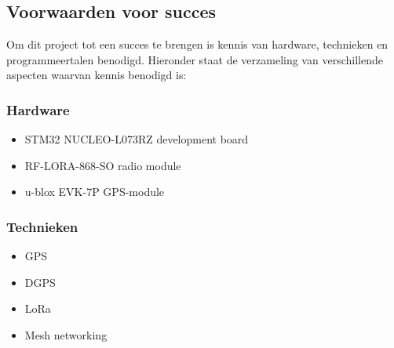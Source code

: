\newpage
\subsection{Voorwaarden voor succes}
Om dit project tot een succes te brengen is kennis van hardware, technieken
en programmeertalen benodigd. Hieronder staat de verzameling van verschillende
aspecten waarvan kennis benodigd is:
\subsubsection{Hardware}
\begin{itemize}
    \item STM32 NUCLEO-L073RZ development board
    \item RF-LORA-868-SO radio module
    \item u-blox EVK-7P GPS-module
\end{itemize}
\subsubsection{Technieken}
\begin{itemize}
    \item GPS
    \item DGPS
    \item LoRa
    \item Mesh networking
\end{itemize}
